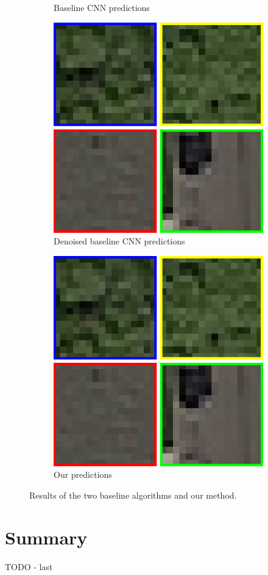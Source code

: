 \documentclass[10pt,conference,compsocconf]{IEEEtran}
\begin{document}
\begin{figure}
\begin{subfigure}[t]{.2\textwidth}
		\caption{Baseline CNN predictions}
	\end{subfigure}	
	\begin{subfigure}[t]{.2\textwidth}
		\includegraphics[width=1\textwidth]{figs/context_size/context16}
		\caption{Denoised baseline CNN predictions}
	\end{subfigure}	
	\begin{subfigure}[t]{.2\textwidth}
		\includegraphics[width=1\textwidth]{figs/context_size/context16}
		\caption{Our predictions}
	\end{subfigure}		
	\caption{Results of the two baseline algorithms and our method.}	
	\label{fig:resuls}
\end{figure}
\section{Summary}
\label{sec:summary}
TODO - last



\end{document}
